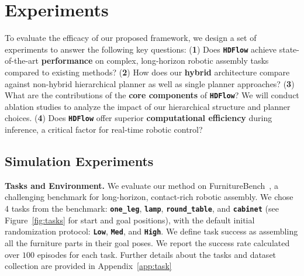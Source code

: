 \documentclass{article} %
\begin{document}
\section{Experiments}
\vspace{-8pt}
To evaluate the efficacy of our proposed framework, we design a set of experiments to answer the following key questions: (\textbf{1}) Does \texttt{\textbf{HDFlow}} achieve state-of-the-art \textbf{performance} on complex, long-horizon robotic assembly tasks compared to existing methods? (\textbf{2}) How does our \textbf{hybrid} architecture compare against non-hybrid hierarchical planner as well as single planner approaches? (\textbf{3}) What are the contributions of the \textbf{core components} of \texttt{\textbf{HDFlow}}? We will conduct ablation studies to analyze the impact of our hierarchical structure and planner choices. (\textbf{4}) Does \texttt{\textbf{HDFlow}} offer superior \textbf{computational efficiency} during inference, a critical factor for real-time robotic control?

\subsection{Simulation Experiments}
\vspace{-5pt}
\textbf{Tasks and Environment.} We evaluate our method on FurnitureBench~\citep{heo2025furniturebench}, a challenging benchmark for long-horizon, contact-rich robotic assembly. We chose 4 tasks from the benchmark: \texttt{\textbf{one\_leg}}, \texttt{\textbf{lamp}}, \texttt{\textbf{round\_table}}, and \texttt{\textbf{cabinet}} (see Figure~\ref{fig:tasks} for start and goal positions), with the default initial randomization protocol: \texttt{\textbf{Low}}, \texttt{\textbf{Med}}, and \texttt{\textbf{High}}. We define task success as assembling all the furniture parts in their goal poses. We report the success rate calculated over $100$ episodes for each task. Further details about the tasks and dataset collection are provided in Appendix~\ref{app:task}
\end{document}
